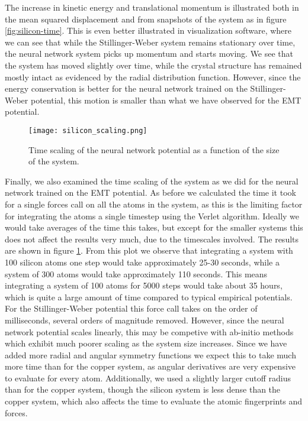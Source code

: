 The increase in kinetic energy and translational momentum is illustrated
both in the mean squared displacement and from snapshots of the system
as in figure \ref{fig:silicon-time}. This is even better illustrated
in visualization software, where we can see that while the
Stillinger-Weber system remains stationary over time, the neural network
system picks up momentum and starts moving.
We see that the system has moved slightly over time, while the crystal
structure has remained mostly intact as evidenced by the radial distribution
function.
However, since the energy conservation is better for the neural network
trained on the Stillinger-Weber potential, this motion is smaller
than what we have observed for the EMT potential.

\begin{figure}
    \centering
    \texttt{[image: silicon\_scaling.png]}
    \caption{Time scaling of the neural network potential
        as a function of the size of the system.}
    \label{fig:silicon-scaling}
\end{figure}

Finally, we also examined the time scaling of the system as we did for the
neural network trained on the EMT potential.
As before we calculated the time it took for a single forces call
on all the atoms in the system, as this is the limiting
factor for integrating the atoms a single timestep using the
Verlet algorithm.
Ideally we would take averages of the time this takes, but except
for the smaller systems this does not affect the results very much,
due to the timescales involved.
The results are shown in figure \ref{fig:silicon-scaling}.
From this plot we observe that integrating a system
with 100 silicon atoms one step would take approximately
25-30 seconds, while a system of 300 atoms would take approximately
110 seconds. This means integrating a system of 100 atoms
for 5000 steps would take about 35 hours, which is quite
a large amount of time compared to typical empirical potentials.
For the Stillinger-Weber potential this force call
takes on the order of milliseconds, several orders of magnitude removed.
However, since the neural network potential scales linearly, this may be competive
with ab-initio methods which exhibit much poorer scaling as the system size increases.
Since we have added more radial and angular symmetry functions
we expect this to take much more time than for the copper system,
as angular derivatives are very expensive to evaluate for every atom.
Additionally, we used a slightly larger cutoff radius than for the copper system,
though the silicon system is less dense than the copper system, which also
affects the time to evaluate the atomic fingerprints and forces.
